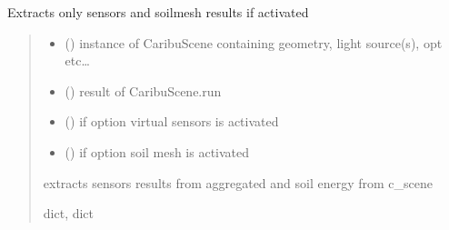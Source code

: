 \documentclass[letterpaper,10pt,english]{sphinxmanual}
\begin{document}
\begin{fulllineitems}
\label{\detokenize{reference:outputs.out_caribu_nomix}}
\pysigstartsignatures
{}
\pysigstopsignatures
\sphinxAtStartPar
Extracts only sensors and soilmesh results if activated
\begin{quote}\begin{description}
\begin{itemize}
\item {} 
\sphinxAtStartPar
{} () \textendash{} instance of CaribuScene containing geometry, light source(s), opt etc…

\item {} 
\sphinxAtStartPar
{} () \textendash{} result of CaribuScene.run

\item {} 
\sphinxAtStartPar
{} () \textendash{} if option virtual sensors is activated

\item {} 
\sphinxAtStartPar
{} () \textendash{} if option soil mesh is activated

\end{itemize}

\sphinxAtStartPar
extracts sensors results from aggregated and soil energy from c\_scene

\sphinxAtStartPar
dict, dict

\end{description}\end{quote}

\end{fulllineitems}

\end{document}

